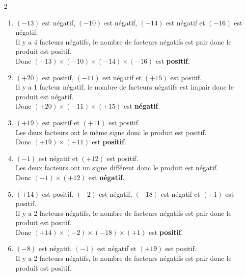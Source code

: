 \begin{corrige}
    \phantom{rrr}
    \begin{multicols}2
        \begin{enumerate}
            \item $ (-13) $ est négatif, $ (-10) $ est négatif, $ (-14) $ est négatif et $ (-16) $ est négatif.\\
                  Il y a 4 facteurs négatifs, le nombre de facteurs négatifs est pair donc le produit est positif.\\
                  Donc $ (-13) \times (-10) \times (-14) \times (-16) $ est {\bfseries \color[HTML]{f15929}positif}.
            \item $ (+20) $ est positif, $ (-11) $ est négatif et $ (+15) $ est positif.\\
                  Il y a 1 facteur négatif, le nombre de facteurs négatifs est impair donc le produit est négatif.\\
                  Donc $ (+20) \times (-11) \times (+15) $ est {\bfseries \color[HTML]{f15929}négatif}.
            \item $ (+19) $ est positif et $ (+11) $ est positif.\\
                  Les deux facteurs ont le même signe donc le produit est positif.\\
                  Donc $ (+19) \times (+11) $ est {\bfseries \color[HTML]{f15929}positif}.
            \item $ (-1) $ est négatif et $ (+12) $ est positif.\\
                  Les deux facteurs ont un signe différent donc le produit est négatif.\\
                  Donc $ (-1) \times (+12) $ est {\bfseries \color[HTML]{f15929}négatif}.
            \item $ (+14) $ est positif, $ (-2) $ est négatif, $ (-18) $ est négatif et $ (+1) $ est positif.\\
                  Il y a 2 facteurs négatifs, le nombre de facteurs négatifs est pair donc le produit est positif.\\
                  Donc $ (+14) \times (-2) \times (-18) \times (+1) $ est {\bfseries \color[HTML]{f15929}positif}.
            \item $ (-8) $ est négatif, $ (-1) $ est négatif et $ (+19) $ est positif.\\
                  Il y a 2 facteurs négatifs, le nombre de facteurs négatifs est pair donc le produit est positif.\\

\end{enumerate}
\end{multicols}
\end{corrige}
